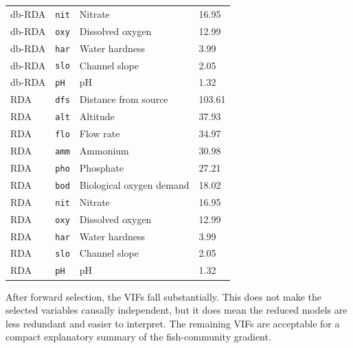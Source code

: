 \documentclass[11pt]{article}
\begin{document}
\begin{table}[!h]
{\begin{tabular}[t]{llll}
db-RDA & \texttt{nit} & Nitrate & 16.95\\
db-RDA & \texttt{oxy} & Dissolved oxygen & 12.99\\
db-RDA & \texttt{har} & Water hardness & 3.99\\
db-RDA & \texttt{slo} & Channel slope & 2.05\\
db-RDA & \texttt{pH} & pH & 1.32\\
RDA & \texttt{dfs} & Distance from source & 103.61\\
RDA & \texttt{alt} & Altitude & 37.93\\
RDA & \texttt{flo} & Flow rate & 34.97\\
RDA & \texttt{amm} & Ammonium & 30.98\\
RDA & \texttt{pho} & Phosphate & 27.21\\
RDA & \texttt{bod} & Biological oxygen demand & 18.02\\
RDA & \texttt{nit} & Nitrate & 16.95\\
RDA & \texttt{oxy} & Dissolved oxygen & 12.99\\
RDA & \texttt{har} & Water hardness & 3.99\\
RDA & \texttt{slo} & Channel slope & 2.05\\
RDA & \texttt{pH} & pH & 1.32\\
\bottomrule
\end{tabular}}
\end{table}
After forward selection, the VIFs fall substantially. This does not make the selected variables causally independent, but it does mean the reduced models are less redundant and easier to interpret. The remaining VIFs are acceptable for a compact explanatory summary of the fish-community gradient.
\begin{table}[!h]
\centering
\caption{\label{tab:tab:selected-vif}Variance inflation factors for the selected constrained models after forward selection.}
\centering
{}
\end{table}
\end{document}
